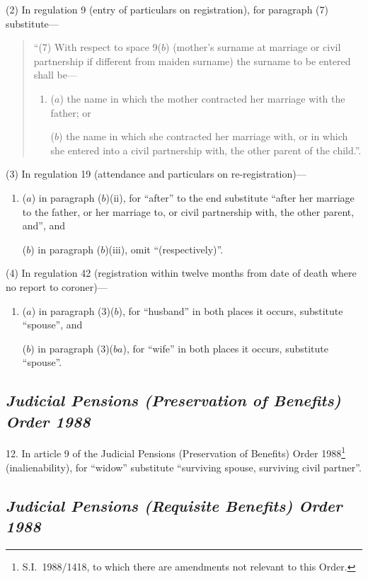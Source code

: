 \documentclass[12pt,a4paper]{article}
\begin{document}
(2) In regulation 9 (entry of particulars on registration), for paragraph (7) substitute—
\begin{quotation}
“(7) With respect to space 9($b$)  (mother’s surname at marriage or civil partnership if different from maiden surname) the surname to be entered shall be—
\begin{enumerate}\item[]
($a$) the name in which the mother contracted her marriage with the father; or

($b$) the name in which she contracted her marriage with, or in which she entered into a civil partnership with, the other parent of the child.”.
\end{enumerate}
\end{quotation}

(3) In regulation 19 (attendance and particulars on re-registration)—
\begin{enumerate}\item[]
($a$) in paragraph ($b$)(ii), for “after” to the end substitute “after her marriage to the father, or her marriage to, or civil partnership with, the other parent, and”, and

($b$) in paragraph ($b$)(iii), omit “(respectively)”.
\end{enumerate}

(4) In regulation 42 (registration within twelve months from date of death where no report to coroner)—
\begin{enumerate}\item[]
($a$) in paragraph (3)($b$), for “husband” in both places it occurs, substitute “spouse”, and

($b$) in paragraph (3)($ba$), for “wife” in both places it occurs, substitute “spouse”.
\end{enumerate}

\subsection*{\itshape\sloppy Judicial Pensions (Preservation of Benefits) Order 1988}

12.  In article 9 of the Judicial Pensions (Preservation of Benefits) Order 1988\footnote{S.I.~1988/1418, to which there are amendments not relevant to this Order.} (inalienability), for “widow” substitute “surviving spouse, surviving civil partner”.

\subsection*{\itshape Judicial Pensions (Requisite Benefits) Order 1988}
\end{document}
